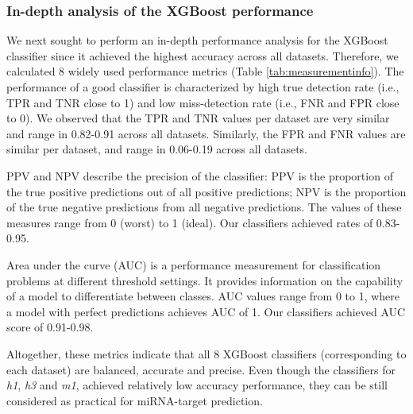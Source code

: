 \documentclass{bmcart}
\begin{document}
\subsubsection*{In-depth analysis of the XGBoost performance}
We next sought to perform an in-depth performance analysis for the XGBoost classifier since it achieved the highest accuracy across all datasets. Therefore, we calculated 8 widely used performance metrics (Table \ref{tab:measurementinfo}). The performance of a good classifier is characterized by high true detection rate (i.e., TPR and TNR close to 1) and low miss-detection rate (i.e., FNR and FPR close to 0). We observed that the TPR and TNR values per dataset are very similar and range in 0.82-0.91 across all datasets. Similarly, the FPR and FNR values are similar per dataset, and range in 0.06-0.19 across all datasets. 

PPV and NPV describe the precision of the classifier: PPV is the proportion of the true positive predictions out of all positive predictions; NPV is the proportion of the true negative predictions from all negative predictions. The values of these measures range from 0 (worst) to 1 (ideal). Our classifiers achieved rates of 0.83-0.95.

Area under the curve (AUC) is a performance measurement for classification problems at different threshold settings. It provides information on the capability of a model to differentiate between classes. AUC values range from 0 to 1, where a model with perfect predictions achieves AUC of 1. Our classifiers achieved AUC score of 0.91-0.98.

Altogether, these metrics indicate that all 8 XGBoost classifiers (corresponding to each dataset) are balanced, accurate and precise. Even though the classifiers for \textit{h1}, \textit{h3} and \textit{m1}, achieved relatively low accuracy performance, they can be still considered as practical for miRNA-target prediction.
\end{document}
